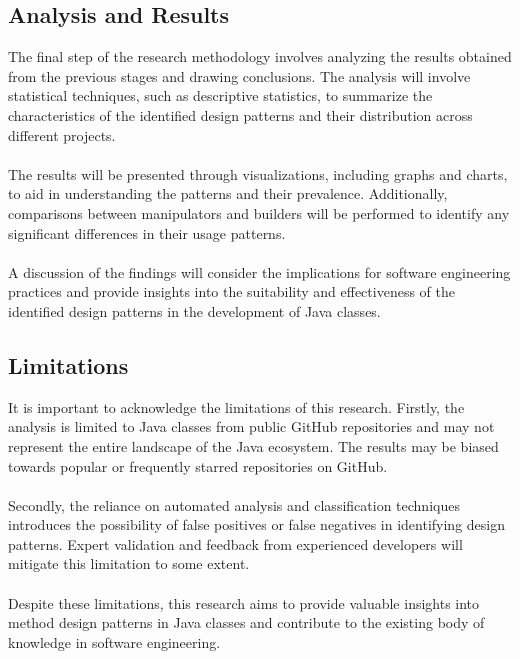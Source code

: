 \documentclass[draft]{article}
\begin{document}
\subsection{Analysis and Results}
The final step of the research methodology involves analyzing the results obtained from the previous stages and drawing conclusions. The analysis will involve statistical techniques, such as descriptive statistics, to summarize the characteristics of the identified design patterns and their distribution across different projects.\\
~\\
The results will be presented through visualizations, including graphs and charts, to aid in understanding the patterns and their prevalence. Additionally, comparisons between manipulators and builders will be performed to identify any significant differences in their usage patterns.\\
~\\
A discussion of the findings will consider the implications for software engineering practices and provide insights into the suitability and effectiveness of the identified design patterns in the development of Java classes.
\subsection{Limitations}
It is important to acknowledge the limitations of this research. Firstly, the analysis is limited to Java classes from public GitHub repositories and may not represent the entire landscape of the Java ecosystem. The results may be biased towards popular or frequently starred repositories on GitHub.\\
~\\
Secondly, the reliance on automated analysis and classification techniques introduces the possibility of false positives or false negatives in identifying design patterns. Expert validation and feedback from experienced developers will mitigate this limitation to some extent.\\
~\\
Despite these limitations, this research aims to provide valuable insights into method design patterns in Java classes and contribute to the existing body of knowledge in software engineering.\\
~\\

\newpage
\end{document}
